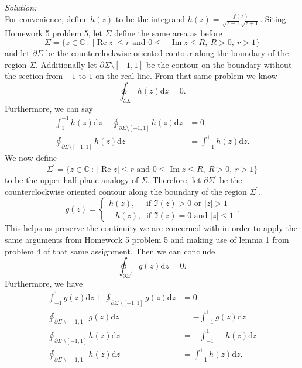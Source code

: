 \documentclass[10pt]{amsart}
\newcommand{\D}{\mathrm{d}}
\DeclareMathOperator{\real}{Re}
\DeclareMathOperator{\imag}{Im}
\theoremstyle{nonumberplain}
\begin{document}
\begin{enumerate}[label={\bf {\arabic*}:}]
\begin{enumerate}
\noindent
\textit{Solution:} \\
For convenience, define $h(z)$ to be the integrand $h(z) = \frac{f(z)}{\sqrt{z -1} \sqrt{z + 1}}$.
Siting Homework 5 problem 5, let $\Sigma$ define the same area as before
$$\Sigma = \{z \in \mathbb C ~:~ |\real z | \leq r \text{ and } 0 \leq -\imag z \leq R, ~ R > 0, ~ r > 1\}$$
and let $\partial \Sigma$ be the counterclockwise oriented contour along the boundary of the region $\Sigma$.
Additionally let $\partial \Sigma \setminus [-1, 1]$ be the contour on the boundary without the section from $-1$ to $1$ on the real line.
From that same problem we know 
$$
\oint_{\partial \Sigma} h(z) \D z = 0.
$$
Furthermore, we can say
\begin{align}
\int_1^{-1} h(z) \D z + \oint_{\partial \Sigma \setminus [-1, 1]} h(z) \D z &= 0 \nonumber \\
\oint_{\partial \Sigma \setminus [-1, 1]} h(z) \D z &= \int_{-1}^1 h(z) \D z.
\label{eq:lower_rectangle}
\end{align}
We now define
$$ \Sigma^\prime = \{z \in \mathbb C ~:~ |\real z | \leq r \text{ and } 0 \leq \imag z \leq R, ~ R > 0, ~ r > 1\} $$
to be the upper half plane analogy of $\Sigma$.
Therefore, let $\partial \Sigma^\prime$ be the counterclockwise oriented contour along the boundary of the region $\Sigma^\prime$.
$$
g(z) = \begin{cases}
h(z), \quad \text{ if } \Im(z) > 0 \text{ or } |z| > 1 \\
- h(z), \: \text{ if } \Im(z) = 0 \text{ and } |z| \leq 1
\end{cases}.
$$
This helps us preserve the continuity we are concerned with in order to apply the same arguments from Homework 5 problem 5 and making use of lemma 1 from problem 4 of that same assignment.
Then we can conclude
$$\oint_{\partial \Sigma^\prime} g(z) \D z =  0. $$
Furthermore, we have
\begin{align}
\int_{-1}^1 g(z) \D z + \oint_{\partial \Sigma^\prime\setminus[-1,1]} g(z) \D z &= 0 \nonumber \\
	\oint_{\partial \Sigma^\prime\setminus[-1,1]} g(z) \D z &= - \int_{-1}^1 g(z) \D z \nonumber \\
	\oint_{\partial \Sigma^\prime\setminus[-1,1]} h(z) \D z &= - \int_{-1}^1 -h(z) \D z \nonumber \\
	\oint_{\partial \Sigma^\prime\setminus[-1,1]} h(z) \D z &= \int_{-1}^1 h(z) \D z.
\label{eq:upper_rectangle}
\end{align}


\end{enumerate}
\end{enumerate}
\end{document}
